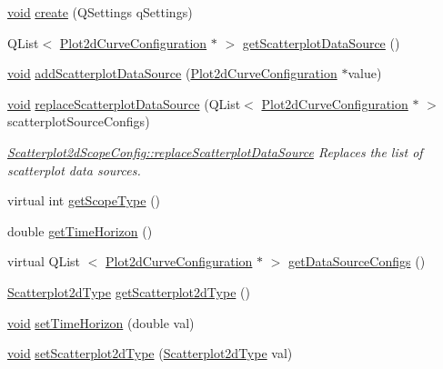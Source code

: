 \begin{DoxyCompactItemize}
\hyperlink{group___u_a_v_objects_plugin_ga444cf2ff3f0ecbe028adce838d373f5c}{void} \hyperlink{group___scope_plugin_ga5b5afb4928f9ea75b7606be6a4138a3d}{create} (\-Q\-Settings q\-Settings)
\item 
\-Q\-List$<$ \hyperlink{struct_plot2d_curve_configuration}{\-Plot2d\-Curve\-Configuration} $\ast$ $>$ \hyperlink{group___scope_plugin_ga56246d3456c2ccf8cc5a851d3fd956f4}{get\-Scatterplot\-Data\-Source} ()
\item 
\hyperlink{group___u_a_v_objects_plugin_ga444cf2ff3f0ecbe028adce838d373f5c}{void} \hyperlink{group___scope_plugin_gac77a97364a3c7dc1e41da11bd400c551}{add\-Scatterplot\-Data\-Source} (\hyperlink{struct_plot2d_curve_configuration}{\-Plot2d\-Curve\-Configuration} $\ast$value)
\item 
\hyperlink{group___u_a_v_objects_plugin_ga444cf2ff3f0ecbe028adce838d373f5c}{void} \hyperlink{group___scope_plugin_ga9fa344bf8a33a2d154be6922d8cc7915}{replace\-Scatterplot\-Data\-Source} (\-Q\-List$<$ \hyperlink{struct_plot2d_curve_configuration}{\-Plot2d\-Curve\-Configuration} $\ast$ $>$ scatterplot\-Source\-Configs)
\begin{DoxyCompactList}\small\item\em \hyperlink{group___scope_plugin_ga9fa344bf8a33a2d154be6922d8cc7915}{\-Scatterplot2d\-Scope\-Config\-::replace\-Scatterplot\-Data\-Source} \-Replaces the list of scatterplot data sources. \end{DoxyCompactList}\item 
virtual int \hyperlink{group___scope_plugin_gaca53d526ca13b2be6f8e11ea754929a7}{get\-Scope\-Type} ()
\item 
double \hyperlink{group___scope_plugin_ga66b9fcd762689ee3c5692552de87d7d1}{get\-Time\-Horizon} ()
\item 
virtual \-Q\-List\*
$<$ \hyperlink{struct_plot2d_curve_configuration}{\-Plot2d\-Curve\-Configuration} $\ast$ $>$ \hyperlink{group___scope_plugin_ga7ca2caad5fa0ed638d0681c5d3270241}{get\-Data\-Source\-Configs} ()
\item 
\hyperlink{group___scope_plugin_gac3cffd2a84d02f4ebfba6df970d03e97}{\-Scatterplot2d\-Type} \hyperlink{group___scope_plugin_ga09fc23adf2e2a28804bcf775ea00057c}{get\-Scatterplot2d\-Type} ()
\item 
\hyperlink{group___u_a_v_objects_plugin_ga444cf2ff3f0ecbe028adce838d373f5c}{void} \hyperlink{group___scope_plugin_gaecbec1456088d121dbf2b9f63a45c6ab}{set\-Time\-Horizon} (double val)
\item 
\hyperlink{group___u_a_v_objects_plugin_ga444cf2ff3f0ecbe028adce838d373f5c}{void} \hyperlink{group___scope_plugin_ga67790b6de2598e4ff9f2d585fee11d09}{set\-Scatterplot2d\-Type} (\hyperlink{group___scope_plugin_gac3cffd2a84d02f4ebfba6df970d03e97}{\-Scatterplot2d\-Type} val)

\end{DoxyCompactItemize}
